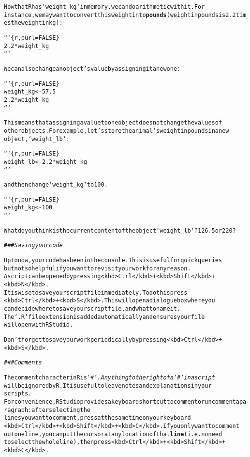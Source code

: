 \documentclass{article}\usepackage[]{graphicx}\usepackage[]{xcolor}
\makeatletter
\newcommand{\hlstr}[1]{\textcolor[rgb]{0.192,0.494,0.8}{#1}}%
\newcommand{\hlcom}[1]{\textcolor[rgb]{0.678,0.584,0.686}{\textit{#1}}}%
\newcommand{\hlkwd}[1]{\textcolor[rgb]{0.737,0.353,0.396}{\textbf{#1}}}%
\newenvironment{kframe}{%
 \def\at@end@of@kframe{}%
 \ifinner\ifhmode%
  \def\at@end@of@kframe{\end{minipage}}%
  \begin{minipage}{\columnwidth}%
 \fi\fi%
 \def\FrameCommand##1{\hskip\@totalleftmargin \hskip-\fboxsep
 \colorbox{shadecolor}{##1}\hskip-\fboxsep
     \hskip-\linewidth \hskip-\@totalleftmargin \hskip\columnwidth}%
 \MakeFramed {\advance\hsize-\width
   \@totalleftmargin\z@ \linewidth\hsize
   \@setminipage}}%
 {\par\unskip\endMakeFramed%
 \at@end@of@kframe}
\newenvironment{knitrout}{}{} %
\makeatother
\begin{document}
\begin{knitrout}
\begin{kframe}
\begin{alltt}
Now that R has `weight_kg` in memory, we can do arithmetic with it. For
instance, we may want to convert this weight into \hlkwd{pounds} (weight in pounds is 2.2 times the weight in kg):

```\{r, purl = FALSE\}
2.2 * weight_kg
```

We can also change an object's value by assigning it a new one:

```\{r, purl = FALSE\}
weight_kg <- 57.5
2.2 * weight_kg
```

This means that assigning a value to one object does not change the values of
other objects. For example, let\hlstr{'s store the animal'}s weight in pounds in a new
object, `weight_lb`:

```\{r, purl = FALSE\}
weight_lb <- 2.2 * weight_kg
```

and then change `weight_kg` to 100.

```\{r, purl = FALSE\}
weight_kg <- 100
```

What do you think is the current content of the object `weight_lb`? 126.5 or 220?

\hlcom{### Saving your code}

Up to now, your code has been in the console. This is useful for quick queries
but not so helpful if you want to revisit your work for any reason.
A script can be opened by pressing <kbd>Ctrl</kbd> + <kbd>Shift</kbd> +
<kbd>N</kbd>.
It is wise to save your script file immediately. To do this press
<kbd>Ctrl</kbd> + <kbd>S</kbd>. This will open a dialogue box where you
can decide where to save your script file, and what to name it.
The `.R` file extension is added automatically and ensures your file
will open with RStudio.

Don't forget to save your work periodically by pressing <kbd>Ctrl</kbd> +
<kbd>S</kbd>.


\hlcom{### Comments}

The comment character in R is `\hlcom{#`.  Anything to the right of a `#` in a script}
will be ignored by R. It is useful to leave notes and explanations in your
scripts.
For convenience, RStudio provides a keyboard shortcut to comment or uncomment a paragraph: after selecting the
lines you  want to comment, press at the same time on your keyboard
<kbd>Ctrl</kbd> + <kbd>Shift</kbd> + <kbd>C</kbd>. If you only want to comment
out one line, you can put the cursor at any location of that \hlkwd{line} (i.e. no need
to select the whole line), then press <kbd>Ctrl</kbd> + <kbd>Shift</kbd> +
<kbd>C</kbd>.


\end{alltt}
\end{kframe}
\end{knitrout}
\end{document}
